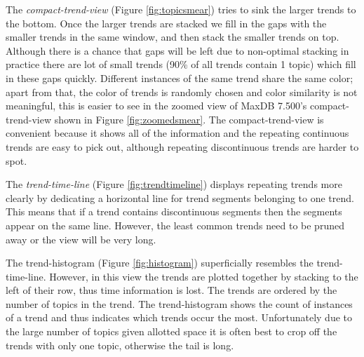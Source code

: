 \documentclass[times, 10pt,twocolumn]{article}
\begin{document}
The \emph{compact-trend-view} (Figure \ref{fig:topicsmear}) tries to
sink the larger trends to the bottom.  Once the larger trends are
stacked we fill in the gaps with the smaller trends in the same
window, and then stack the smaller trends on top.  Although there is a
chance that gaps will be left due to non-optimal stacking in practice
there are lot of small trends (90\% of all trends contain 1 topic)
which fill in these gaps quickly.  Different instances of the same
trend share the same color; apart from that, the color of trends is
randomly chosen and color similarity is not meaningful, this is easier
to see in the zoomed view of MaxDB 7.500's compact-trend-view shown in
Figure \ref{fig:zoomedsmear}.  The compact-trend-view is convenient
because it shows all of the information and the repeating continuous
trends are easy to pick out, although repeating discontinuous trends
are harder to spot.

The \emph{trend-time-line} (Figure
\ref{fig:trendtimeline}) displays repeating trends more clearly by
dedicating a horizontal line for trend segments belonging to one
trend. This means that if a trend contains discontinuous segments then
the segments appear on the same line.  However, the least common
trends need to be pruned away or the view will be very long.

The {trend-histogram} (Figure \ref{fig:histogram}) superficially
resembles the trend-time-line.  However, in this view the trends are
plotted together by stacking to the left of their row, thus time
information is lost.  The trends are ordered by the number of topics
in the trend.  The trend-histogram shows the count of instances of a
trend and thus indicates which trends occur the most. Unfortunately
due to the large number of topics given allotted space it is often
best to crop off the trends with only one topic, otherwise the tail is
long.
\end{document}
